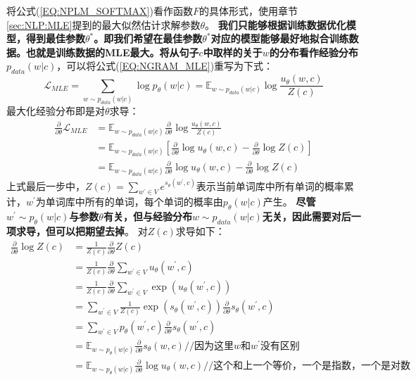 \documentclass{article}
\begin{document}
将公式(\ref{EQ:NPLM_SOFTMAX})看作函数$F$的具体形式，使用章节\ref{sec:NLP:MLE}提到的最大似然估计求解参数$\theta$。
\textbf{我们只能够根据训练数据优化模型，得到最佳参数$\theta^{*}$。即我们希望在最佳参数$\theta^{*}$对应的模型能够最好地拟合训练数据。也就是训练数据的MLE最大。将从句子$c$中取样的关于$w$的分布看作经验分布$p_{data}(w|c)$}，可以将公式(\ref{EQ:NGRAM_MLE})重写为下式：
\begin{equation}
    \mathcal{L}_{MLE} = \sum_{w \sim p_{data}(w|c)} \log p_\theta (w|c) = \mathbb{E}_{w \sim p_{data}(w|c)} \log \frac{u_\theta(w,c)}{Z(c)}
    \label{EQ:NPLM_MLE_EMPRICAL}
\end{equation}
最大化经验分布即是对$\theta$求导：
\begin{equation}
    \begin{split}
        \frac{\partial}{\partial \theta} \mathcal{L}_{MLE} &= \mathbb{E}_{w \sim p_{data}(w|c)} \frac{\partial}{\partial \theta} \log \frac{u_\theta (w,c)}{Z(c)} \\
        &= \mathbb{E}_{w \sim p_{data}(w|c)} [ \frac{\partial}{\partial \theta} \log u_\theta (w,c) - \frac{\partial}{\partial \theta} \log Z(c)] \\
        &= \mathbb{E}_{w \sim p_{data}(w|c)} \frac{\partial}{\partial \theta} \log u_\theta (w,c) - \frac{\partial}{\partial \theta} \log Z(c)
    \end{split}
    \label{EQ:Derive_MLE}
\end{equation}
上式最后一步中，$Z(c)=\sum_{w^{'}\in V}e^{s_\theta(w^{'},c)}$表示当前单词库中所有单词的概率累计，$w^{'}$为单词库中所有的单词，每个单词的概率由$p_\theta(w|c)$产生。
\textbf{尽管$w^{'}\sim p_\theta(w|c)$与参数$\theta$有关，但与经验分布$w \sim p_{data}(w|c)$无关，因此需要对后一项求导，但可以把期望去掉}。
对$Z(c)$求导如下：
\begin{equation}
    \begin{split}
        \frac{\partial}{\partial \theta} \log Z(c) &= \frac{1}{Z(c)} \frac{\partial}{\partial \theta}Z(c) \\
        &= \frac{1}{Z(c)} \frac{\partial}{\partial \theta} \sum_{w^{'}\in V} u_\theta(w^{'},c) \\
        &= \frac{1}{Z(c)} \frac{\partial}{\partial \theta} \sum_{w^{'}\in V} \exp(u_\theta(w^{'},c)) \\
        &= \sum_{w^{'} \in V} \frac{1}{Z(c)} \exp(s_\theta(w^{'},c)) \frac{\partial}{\partial \theta}s_\theta(w^{'},c) \\
        &= \sum_{w^{'}\in V} p_\theta (w^{'}, c) \frac{\partial}{\partial \theta}s_\theta(w^{'},c)\\
        &= \mathbb{E}_{w \sim p_\theta (w|c)}\frac{\partial}{\partial \theta} s_\theta (w,c) //\textbf{因为这里$w$和$w^{'}$没有区别} \\
        &= \mathbb{E}_{w \sim p_\theta (w|c)}\frac{\partial}{\partial \theta} \log u_\theta (w,c) //\textbf{这个和上一个等价，一个是指数，一个是对数} \\
    \end{split}
    \label{EQ:Derive_Z}
\end{equation}
\end{document}
